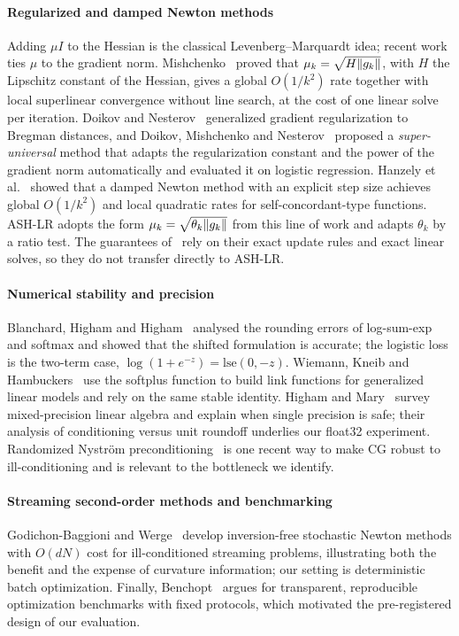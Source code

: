 \paragraph{Regularized and damped Newton methods}
Adding $\mu I$ to the Hessian is the classical Levenberg--Marquardt idea; recent work
ties $\mu$ to the gradient norm. Mishchenko~\cite{mishchenko2023regularized} proved
that $\mu_k=\sqrt{H\lVert g_k\rVert}$, with $H$ the Lipschitz constant of the Hessian, gives
a global $O(1/k^2)$ rate together with local superlinear convergence without line
search, at the cost of one linear solve per iteration. Doikov and
Nesterov~\cite{doikov2024gradient} generalized gradient regularization to Bregman
distances, and Doikov, Mishchenko and Nesterov~\cite{doikov2024super} proposed a
\emph{super-universal} method that adapts the regularization constant and the power of
the gradient norm automatically and evaluated it on logistic regression. Hanzely et
al.~\cite{hanzely2022damped} showed that a damped Newton method with an explicit step
size achieves global $O(1/k^2)$ and local quadratic rates for self-concordant-type
functions. ASH-LR adopts the form $\mu_k=\sqrt{\theta_k\lVert g_k\rVert}$ from this line of
work and adapts $\theta_k$ by a ratio test. The guarantees
of~\cite{mishchenko2023regularized,doikov2024super,doikov2024gradient} rely on their
exact update rules and exact linear solves, so they do not transfer directly to
ASH-LR.

\paragraph{Numerical stability and precision}
Blanchard, Higham and Higham~\cite{blanchard2021accurately} analysed the rounding
errors of log-sum-exp and softmax and showed that the shifted formulation is
accurate; the logistic loss is the two-term case, $\log(1+e^{-z})=\mathrm{lse}(0,-z)$.
Wiemann, Kneib and Hambuckers~\cite{wiemann2024softplus} use the softplus function to
build link functions for generalized linear models and rely on the same stable
identity. Higham and Mary~\cite{higham2022mixed} survey mixed-precision linear algebra
and explain when single precision is safe; their analysis of conditioning versus unit
roundoff underlies our float32 experiment. Randomized Nystr\"om
preconditioning~\cite{frangella2023randomized} is one recent way to make CG robust to
ill-conditioning and is relevant to the bottleneck we identify.

\paragraph{Streaming second-order methods and benchmarking}
Godichon-Baggioni and Werge~\cite{godichon2025adaptive} develop inversion-free
stochastic Newton methods with $O(dN)$ cost for ill-conditioned streaming problems,
illustrating both the benefit and the expense of curvature information; our setting
is deterministic batch optimization. Finally, Benchopt~\cite{moreau2022benchopt}
argues for transparent, reproducible optimization benchmarks with fixed protocols,
which motivated the pre-registered design of our evaluation.
